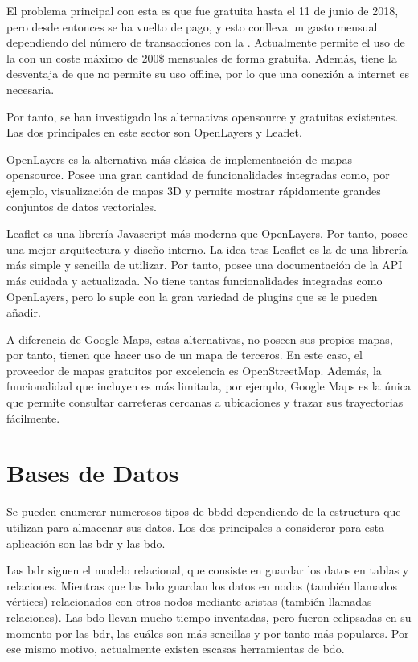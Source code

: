     El problema principal con esta  es que fue gratuita hasta el 11 de junio de 2018, pero desde entonces se ha vuelto de pago, y esto conlleva un gasto mensual dependiendo del número de transacciones con la . Actualmente permite el uso de la  con un coste máximo de 200\$ mensuales de forma gratuita. Además, tiene la desventaja de que no permite su uso offline, por lo que una conexión a internet es necesaria.

    
    Por tanto, se han investigado las alternativas opensource y gratuitas existentes. Las dos  principales en este sector son OpenLayers\cite{openlayers} y Leaflet\cite{leaflet}.
    
    OpenLayers es la alternativa más clásica de implementación de mapas opensource. Posee una gran cantidad de funcionalidades integradas como, por ejemplo, visualización de mapas 3D y permite mostrar rápidamente grandes conjuntos de datos vectoriales.
    
    Leaflet es una librería Javascript más moderna que OpenLayers. Por tanto, posee una mejor arquitectura y diseño interno. La idea tras Leaflet es la de una librería más simple y sencilla de utilizar. Por tanto, posee una documentación de la API más cuidada y actualizada. No tiene tantas funcionalidades integradas como OpenLayers, pero lo suple con la gran variedad de plugins que se le pueden añadir.
    
    A diferencia de Google Maps, estas alternativas, no poseen sus propios mapas, por tanto, tienen que hacer uso de un mapa de terceros. En este caso, el proveedor de mapas gratuitos por excelencia es OpenStreetMap\cite{osm}. Además, la funcionalidad que incluyen es más limitada, por ejemplo, Google Maps es la única que permite consultar carreteras cercanas a ubicaciones y trazar sus trayectorias fácilmente.
  
  
  \section{Bases de Datos}
    Se pueden enumerar numerosos tipos de \ac{bbdd} dependiendo de la estructura que utilizan para almacenar sus datos. Los dos principales a considerar para esta aplicación son las \ac{bdr} y las \ac{bdo}.
    
    Las \ac{bdr} siguen el modelo relacional, que consiste en guardar los datos en tablas y relaciones. Mientras que las \ac{bdo} guardan los datos en nodos (también llamados vértices) relacionados con otros nodos mediante aristas (también llamadas relaciones). Las \ac{bdo} llevan mucho tiempo inventadas, pero fueron eclipsadas en su momento por las \ac{bdr}, las cuáles son más sencillas y por tanto más populares. Por ese mismo motivo, actualmente existen escasas herramientas de \ac{bdo}.
    
